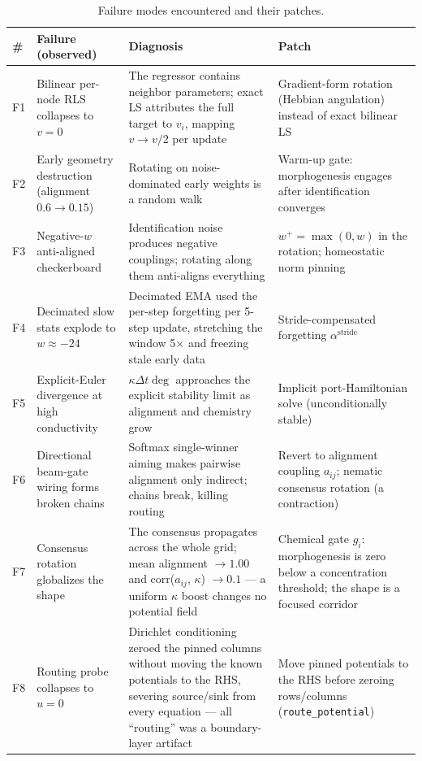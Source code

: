 \documentclass[10pt]{article}
\begin{document}
\begin{table}[h]
\centering\footnotesize
\caption{Failure modes encountered and their patches.}
\setlength{\tabcolsep}{3pt}
\begin{tabular}{L{0.5cm}L{3.3cm}L{5.2cm}L{5.5cm}}
\toprule
\# & Failure (observed) & Diagnosis & Patch \\
\midrule
F1 & Bilinear per-node RLS collapses to $v = 0$ & The regressor contains neighbor parameters; exact LS attributes the full target to $v_i$, mapping $v \to v/2$ per update & Gradient-form rotation (Hebbian angulation) instead of exact bilinear LS \\
F2 & Early geometry destruction (alignment $0.6 \to 0.15$) & Rotating on noise-dominated early weights is a random walk & Warm-up gate: morphogenesis engages after identification converges \\
F3 & Negative-$w$ anti-aligned checkerboard & Identification noise produces negative couplings; rotating along them anti-aligns everything & $w^{+} = \max(0, w)$ in the rotation; homeostatic norm pinning \\
F4 & Decimated slow stats explode to $w \approx -24$ & Decimated EMA used the per-step forgetting per 5-step update, stretching the window 5$\times$ and freezing stale early data & Stride-compensated forgetting $\alpha^{\mathrm{stride}}$ \\
F5 & Explicit-Euler divergence at high conductivity & $\kappa \Delta t \deg$ approaches the explicit stability limit as alignment and chemistry grow & Implicit port-Hamiltonian solve (unconditionally stable) \\
F6 & Directional beam-gate wiring forms broken chains & Softmax single-winner aiming makes pairwise alignment only indirect; chains break, killing routing & Revert to alignment coupling $a_{ij}$; nematic consensus rotation (a contraction) \\
F7 & Consensus rotation globalizes the shape & The consensus propagates across the whole grid; mean alignment $\to 1.00$ and corr($a_{ij}$, $\kappa$) $\to 0.1$ --- a uniform $\kappa$ boost changes no potential field & Chemical gate $g_i$: morphogenesis is zero below a concentration threshold; the shape is a focused corridor \\
F8 & Routing probe collapses to $u = 0$ & Dirichlet conditioning zeroed the pinned columns without moving the known potentials to the RHS, severing source/sink from every equation --- all ``routing'' was a boundary-layer artifact & Move pinned potentials to the RHS before zeroing rows/columns (\texttt{route\_potential}) \\
\bottomrule
\end{tabular}
\end{table}
\end{document}
